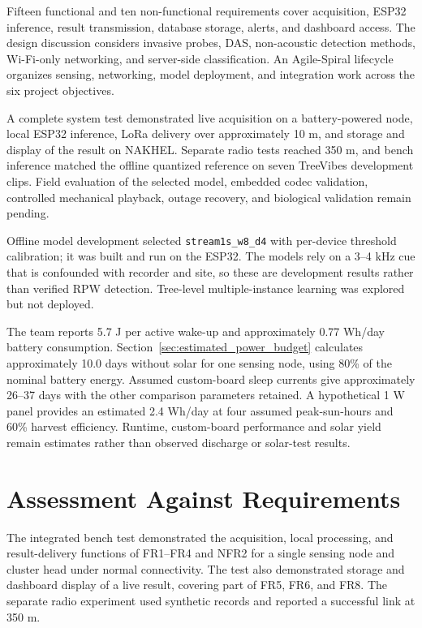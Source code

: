 \documentclass[12pt,a4paper,oneside]{memoir}
\newcommand{\newrevision}[1]{#1}
\begin{document}
\newrevision{Fifteen functional and ten non-functional requirements cover acquisition, ESP32 inference, result transmission, database storage, alerts, and dashboard access. The design discussion considers invasive probes, DAS, non-acoustic detection methods, Wi-Fi-only networking, and server-side classification. An Agile-Spiral lifecycle organizes sensing, networking, model deployment, and integration work across the six project objectives.}

\newrevision{A complete system test demonstrated live acquisition on a battery-powered node, local ESP32 inference, LoRa delivery over approximately 10 m, and storage and display of the result on NAKHEL. Separate radio tests reached 350 m, and bench inference matched the offline quantized reference on seven TreeVibes development clips. Field evaluation of the selected model, embedded codec validation, controlled mechanical playback, outage recovery, and biological validation remain pending.}

\newrevision{Offline model development selected \texttt{stream1s\_w8\_d4} with per-device threshold calibration; it was built and run on the ESP32. The models rely on a 3--4 kHz cue that is confounded with recorder and site, so these are development results rather than verified RPW detection. Tree-level multiple-instance learning was explored but not deployed.}

\newrevision{The team reports 5.7 J per active wake-up and approximately 0.77 Wh/day battery consumption. Section~\ref{sec:estimated_power_budget} calculates approximately 10.0 days without solar for one sensing node, using 80\% of the nominal battery energy. Assumed custom-board sleep currents give approximately 26--37 days with the other comparison parameters retained. A hypothetical 1 W panel provides an estimated 2.4 Wh/day at four assumed peak-sun-hours and 60\% harvest efficiency. Runtime, custom-board performance and solar yield remain estimates rather than observed discharge or solar-test results.}

\section{\newrevision{Assessment Against Requirements}}

\newrevision{The integrated bench test demonstrated the acquisition, local processing, and result-delivery functions of FR1--FR4 and NFR2 for a single sensing node and cluster head under normal connectivity. The test also demonstrated storage and dashboard display of a live result, covering part of FR5, FR6, and FR8. The separate radio experiment used synthetic records and reported a successful link at 350 m.}
\end{document}
